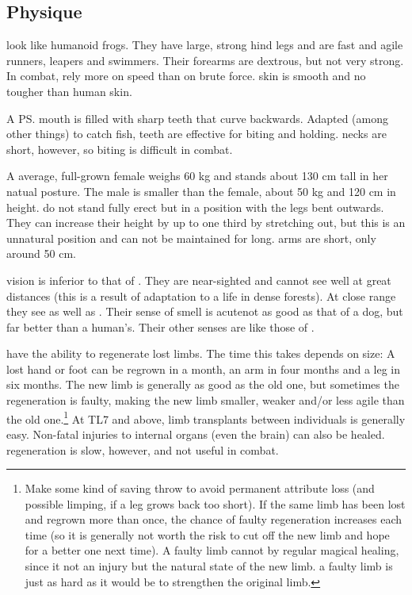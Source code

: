 \subsection{Physique}
\Meccara{} look like humanoid frogs. They have large, strong hind legs and are fast and agile runners, leapers and swimmers. Their forearms are dextrous, but not very strong. In combat, \meccarans{} rely more on speed than on brute force. \Meccaran{} skin is smooth and no tougher than human skin. 

A \ps{\meccaran} mouth is filled with sharp teeth that curve backwards. Adapted (among other things) to catch fish, \meccaran{} teeth are effective for biting and holding. \Meccaran{} necks are short, however, so biting is difficult in combat. 

A average, full-grown \meccaran{} female weighs 60 kg and stands about 130 cm tall in her natual posture. The male is smaller than the female, about 50 kg and 120 cm in height. \Meccarans{} do not stand fully erect but in a  position with the legs bent outwards. They can increase their height by up to one third by stretching out, but this is an unnatural position and can not be maintained for long. \Meccaran{} arms are short, only around 50 cm. 

\Meccaran{} vision is inferior to that of \humans. They are near-sighted and cannot see well at great distances (this is a result of adaptation to a life in dense forests). At close range they see as well as \humans. Their sense of smell is acute\dash not as good as that of a dog, but far better than a human's. Their other senses are like those of \humans. 

\Meccara{} have the ability to regenerate lost limbs. The time this takes depends on size: A lost hand or foot can be regrown in a month, an arm in four months and a leg in six months. The new limb is generally as good as the old one, but sometimes the regeneration is faulty, making the new limb smaller, weaker and/or less agile than the old one.\footnote{Make some kind of saving throw to avoid permanent attribute loss (and possible limping, if a leg grows back too short). If the same limb has been lost and regrown more than once, the chance of faulty regeneration increases each time (so it is generally not worth the risk to cut off the new limb and hope for a better one next time). A faulty limb cannot  by regular magical healing, since it not an injury but the natural state of the new limb.  a faulty limb is just as hard as it would be to strengthen the original limb.} At TL7 and above, limb transplants between individuals is generally easy. Non-fatal injuries to internal organs (even the brain) can also be healed. \Meccaran{} regeneration is slow, however, and not useful in combat. 

